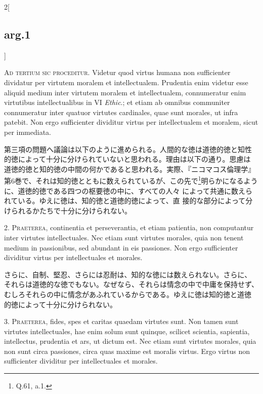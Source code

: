 \documentclass[paper=a4paper,fontsize=10pt,jafontsize=9pt,titlepage]{jlreq}
\begin{document}
\begin{paracol}{2}[\subsection{arg.1}]

{\scshape Ad tertium sic proceditur}. Videtur quod virtus humana non
sufficienter dividatur per virtutem moralem et
intellectualem. Prudentia enim videtur esse aliquid medium inter
virtutem moralem et intellectualem, connumeratur enim virtutibus
intellectualibus in VI {\itshape Ethic}.; et etiam ab omnibus
communiter connumeratur inter quatuor virtutes cardinales, quae sunt
morales, ut infra patebit. Non ergo sufficienter dividitur virtus per
intellectualem et moralem, sicut per immediata.

\switchcolumn

第三項の問題へ議論は以下のように進められる。人間的な徳は道徳的徳と知性
的徳によって十分に分けられていないと思われる。理由は以下の通り。思慮は
道徳的徳と知的徳の中間の何かであると思われる。実際、『ニコマコス倫理学』
第6巻で、それは知的徳とともに数えられているが、この先で\footnote{Q.61,
a.1.}明らかになるように、道徳的徳である四つの枢要徳の中に、すべての人々
によって共通に数えられている。ゆえに徳は、知的徳と道徳的徳によって、直
接的な部分によって分けられるかたちで十分に分けられない。


2. {\scshape Praeterea}, continentia et perseverantia, et etiam
patientia, non computantur inter virtutes intellectuales. Nec etiam
sunt virtutes morales, quia non tenent medium in passionibus, sed
abundant in eis passiones. Non ergo sufficienter dividitur virtus per
intellectuales et morales.

\switchcolumn

さらに、自制、堅忍、さらには忍耐は、知的な徳には数えられない。さらに、
それらは道徳的な徳でもない。なぜなら、それらは情念の中で中庸を保持せず、
むしろそれらの中に情念があふれているからである。ゆえに徳は知的徳と道徳
的徳によって十分に分けられない。


3. {\scshape Praeterea}, fides, spes et caritas quaedam virtutes
sunt. Non tamen sunt virtutes intellectuales, hae enim solum sunt
quinque, scilicet scientia, sapientia, intellectus, prudentia et ars,
ut dictum est. Nec etiam sunt virtutes morales, quia non sunt circa
passiones, circa quas maxime est moralis virtus. Ergo virtus non
sufficienter dividitur per intellectuales et morales.


\end{paracol}
\end{document}
